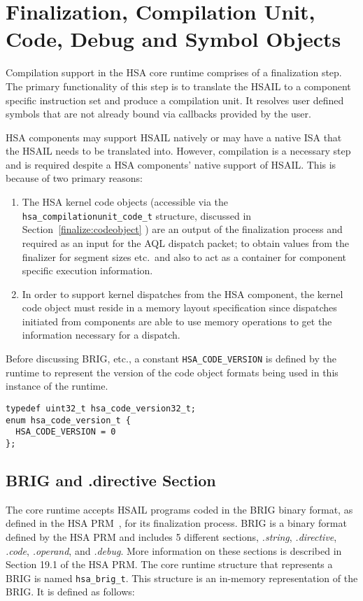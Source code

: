\hypertarget{finalizer}{}\section{Finalization, Compilation Unit, 
Code, Debug and Symbol Objects}\label{finalizer}

Compilation support in the HSA core runtime comprises of a
finalization step. The primary functionality of this step is to
translate the HSAIL to a component specific instruction set and
produce a compilation unit. It resolves user defined symbols that
are not already bound via callbacks provided by the user.

HSA components may support HSAIL natively or may have a native ISA
that the HSAIL needs to be translated into. However, compilation is a
necessary step and is required despite a HSA components' native support
of HSAIL. This is because of two primary reasons:

\begin{enumerate}
\item  The HSA kernel code objects (accessible via the
\texttt{hsa\_compilationunit\_code\_t} structure, discussed in
Section~\ref{finalize:codeobject} ) are an output of the
finalization process and required as an input for the AQL dispatch
packet; to obtain values from the finalizer for segment sizes etc.\
and also to act as a container for component specific execution
information.

\item In order to support kernel dispatches from the HSA
component, the kernel code object must reside in a memory layout
specification since dispatches initiated from components are able
to use memory operations to get the information necessary for a
dispatch.
\end{enumerate}

Before discussing BRIG, etc., a constant \texttt{HSA\_CODE\_VERSION}
is defined by the runtime to represent the version of the code
object formats being used in this instance of the runtime.

\begin{lstlisting}
typedef uint32_t hsa_code_version32_t;
enum hsa_code_version_t {
  HSA_CODE_VERSION = 0
};
\end{lstlisting}

\subsection{BRIG and .directive Section}
The core runtime accepts H\-S\-A\-I\-L programs coded in the
B\-R\-I\-G binary format, as defined in the HSA PRM~\cite{prm}, for its
finalization process. BRIG is a binary format defined by the HSA
PRM and includes 5 different sections, \emph{.string},
\emph{.directive}, \emph{.code}, \emph{.operand}, and \emph{.debug}.
More information on these sections is described in Section 19.1 of
the HSA PRM. The core runtime structure that represents a
BRIG is named \texttt{hsa\_brig\_t}. This structure is an in-memory
representation of the BRIG. It is defined as follows:

